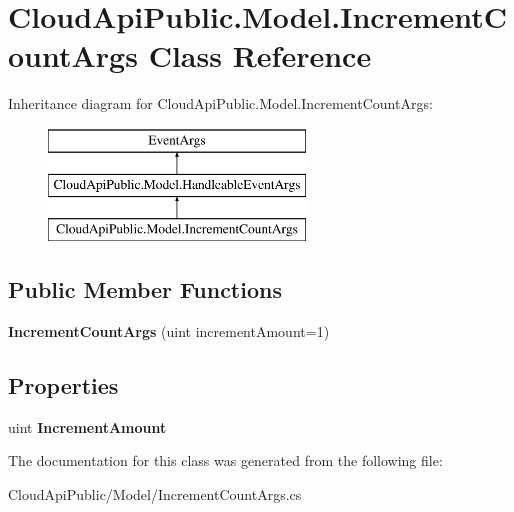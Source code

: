 \hypertarget{class_cloud_api_public_1_1_model_1_1_increment_count_args}{\section{Cloud\-Api\-Public.\-Model.\-Increment\-Count\-Args Class Reference}
\label{class_cloud_api_public_1_1_model_1_1_increment_count_args}
}
Inheritance diagram for Cloud\-Api\-Public.\-Model.\-Increment\-Count\-Args\-:\begin{figure}[H]
\begin{center}
\leavevmode
\includegraphics[height=3.000000cm]{class_cloud_api_public_1_1_model_1_1_increment_count_args}
\end{center}
\end{figure}
\subsection*{Public Member Functions}
\begin{DoxyCompactItemize}
\item 
\hypertarget{class_cloud_api_public_1_1_model_1_1_increment_count_args_a94685a4a9998ff384ae733ef4245e38e}{{\bfseries Increment\-Count\-Args} (uint increment\-Amount=1)}\label{class_cloud_api_public_1_1_model_1_1_increment_count_args_a94685a4a9998ff384ae733ef4245e38e}

\end{DoxyCompactItemize}
\subsection*{Properties}
\begin{DoxyCompactItemize}
\item 
\hypertarget{class_cloud_api_public_1_1_model_1_1_increment_count_args_ac886e1867c380a66e39e5fa86f217783}{uint {\bfseries Increment\-Amount}}\label{class_cloud_api_public_1_1_model_1_1_increment_count_args_ac886e1867c380a66e39e5fa86f217783}

\end{DoxyCompactItemize}


The documentation for this class was generated from the following file\-:\begin{DoxyCompactItemize}
\item 
Cloud\-Api\-Public/\-Model/Increment\-Count\-Args.\-cs\end{DoxyCompactItemize}
